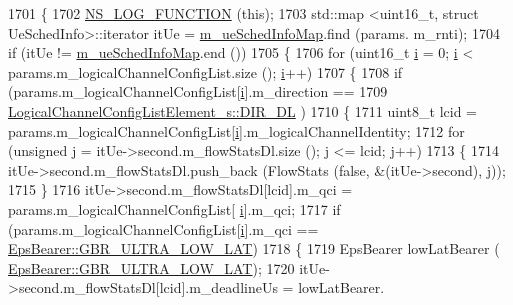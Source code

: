 \begin{DoxyCode}
1701 \{
1702         \hyperlink{log-macros-disabled_8h_a90b90d5bad1f39cb1b64923ea94c0761}{NS\_LOG\_FUNCTION} (\textcolor{keyword}{this});
1703   std::map <uint16\_t, struct UeSchedInfo>::iterator itUe = \hyperlink{classns3_1_1MmWaveFlexTtiPfMacScheduler_a3b6dd19d8156d24c8d30cc562843b740}{m\_ueSchedInfoMap}.find (params.
      m\_rnti);
1704   \textcolor{keywordflow}{if} (itUe != \hyperlink{classns3_1_1MmWaveFlexTtiPfMacScheduler_a3b6dd19d8156d24c8d30cc562843b740}{m\_ueSchedInfoMap}.end ())
1705   \{
1706         \textcolor{keywordflow}{for} (uint16\_t \hyperlink{bernuolliDistribution_8m_a6f6ccfcf58b31cb6412107d9d5281426}{i} = 0; \hyperlink{bernuolliDistribution_8m_a6f6ccfcf58b31cb6412107d9d5281426}{i} < params.m\_logicalChannelConfigList.size (); \hyperlink{bernuolliDistribution_8m_a6f6ccfcf58b31cb6412107d9d5281426}{i}++)
1707         \{
1708                 \textcolor{keywordflow}{if} (params.m\_logicalChannelConfigList[\hyperlink{bernuolliDistribution_8m_a6f6ccfcf58b31cb6412107d9d5281426}{i}].m\_direction ==
1709                                 \hyperlink{structns3_1_1LogicalChannelConfigListElement__s_a0ce1e3a6af4d9a3e9fc19361d0af4e00a31e389072f64c3e83e1da04be05ada0f}{LogicalChannelConfigListElement\_s::DIR\_DL}
      )
1710                 \{
1711                 uint8\_t lcid = params.m\_logicalChannelConfigList[\hyperlink{bernuolliDistribution_8m_a6f6ccfcf58b31cb6412107d9d5281426}{i}].m\_logicalChannelIdentity;
1712                 \textcolor{keywordflow}{for} (\textcolor{keywordtype}{unsigned} j = itUe->second.m\_flowStatsDl.size (); j <= lcid; j++)
1713                 \{
1714                         itUe->second.m\_flowStatsDl.push\_back (FlowStats (\textcolor{keyword}{false}, &(itUe->second), j));
1715                 \}
1716                         itUe->second.m\_flowStatsDl[lcid].m\_qci = params.m\_logicalChannelConfigList[
      \hyperlink{bernuolliDistribution_8m_a6f6ccfcf58b31cb6412107d9d5281426}{i}].m\_qci;
1717                         \textcolor{keywordflow}{if} (params.m\_logicalChannelConfigList[\hyperlink{bernuolliDistribution_8m_a6f6ccfcf58b31cb6412107d9d5281426}{i}].m\_qci == 
      \hyperlink{structns3_1_1EpsBearer_aecf0c67109c5eb4ec0b07226fff5885ea1b3267491c7ea82ddc90b433c429c7c1}{EpsBearer::GBR\_ULTRA\_LOW\_LAT})
1718                         \{
1719                                 EpsBearer lowLatBearer (
      \hyperlink{structns3_1_1EpsBearer_aecf0c67109c5eb4ec0b07226fff5885ea1b3267491c7ea82ddc90b433c429c7c1}{EpsBearer::GBR\_ULTRA\_LOW\_LAT});
1720                                 itUe->second.m\_flowStatsDl[lcid].m\_deadlineUs = lowLatBearer.

\end{DoxyCode}
